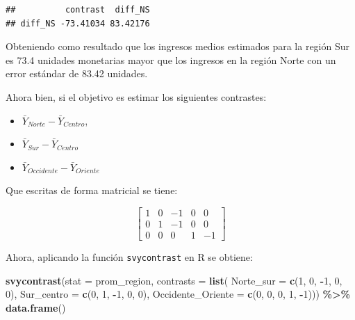 \documentclass[
  12pt,
]{book}
\newenvironment{Shaded}{\begin{snugshade}}{\end{snugshade}}
\newcommand{\AttributeTok}[1]{\textcolor[rgb]{0.13,0.29,0.53}{#1}}
\newcommand{\DecValTok}[1]{\textcolor[rgb]{0.00,0.00,0.81}{#1}}
\newcommand{\FunctionTok}[1]{\textcolor[rgb]{0.13,0.29,0.53}{\textbf{#1}}}
\newcommand{\NormalTok}[1]{#1}
\newcommand{\SpecialCharTok}[1]{\textcolor[rgb]{0.81,0.36,0.00}{\textbf{#1}}}
\providecommand{\tightlist}{%
  \setlength{\itemsep}{0pt}\setlength{\parskip}{0pt}}
\begin{document}
\begin{verbatim}
##          contrast  diff_NS
## diff_NS -73.41034 83.42176
\end{verbatim}

Obteniendo como resultado que los ingresos medios estimados para la región Sur es 73.4 unidades monetarias mayor que los ingresos en la región Norte con un error estándar de 83.42 unidades.

Ahora bien, si el objetivo es estimar los siguientes contrastes:

\begin{itemize}
\tightlist
\item
  \(\bar{Y}_{Norte} - \bar{Y}_{Centro}\),
\item
  \(\bar{Y}_{Sur}-\bar{Y}_{Centro}\)
\item
  \(\bar{Y}_{Occidente}-\bar{Y}_{Oriente}\)
\end{itemize}

Que escritas de forma matricial se tiene:

\[
\left[\begin{array}{ccccc}
1 & 0 & -1 & 0 & 0\\
0 & 1 & -1 & 0 & 0\\
0 & 0 & 0 & 1 & -1
\end{array}\right]
\]

Ahora, aplicando la función \texttt{svycontrast} en R se obtiene:

\begin{Shaded}
\begin{Highlighting}[]
\FunctionTok{svycontrast}\NormalTok{(}\AttributeTok{stat =}\NormalTok{ prom\_region,}
            \AttributeTok{contrasts =} \FunctionTok{list}\NormalTok{(}
                             \AttributeTok{Norte\_sur =} \FunctionTok{c}\NormalTok{(}\DecValTok{1}\NormalTok{, }\DecValTok{0}\NormalTok{, }\SpecialCharTok{{-}}\DecValTok{1}\NormalTok{, }\DecValTok{0}\NormalTok{, }\DecValTok{0}\NormalTok{),}
                             \AttributeTok{Sur\_centro =} \FunctionTok{c}\NormalTok{(}\DecValTok{0}\NormalTok{, }\DecValTok{1}\NormalTok{, }\SpecialCharTok{{-}}\DecValTok{1}\NormalTok{, }\DecValTok{0}\NormalTok{, }\DecValTok{0}\NormalTok{),}
                             \AttributeTok{Occidente\_Oriente =} \FunctionTok{c}\NormalTok{(}\DecValTok{0}\NormalTok{, }\DecValTok{0}\NormalTok{, }\DecValTok{0}\NormalTok{, }\DecValTok{1}\NormalTok{, }\SpecialCharTok{{-}}\DecValTok{1}\NormalTok{))) }\SpecialCharTok{\%\textgreater{}\%}                               \FunctionTok{data.frame}\NormalTok{()}
\end{Highlighting}
\end{Shaded}
\end{document}
